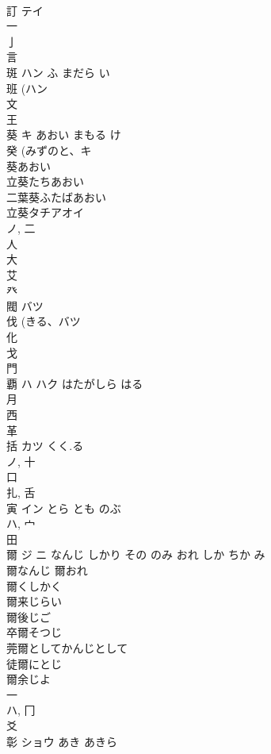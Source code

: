 \documentclass[8pt]{extreport}
\begin{document}
\begin{CJK}{UTF8}{min}
\\	訂	テイ		
\\	一 
\\	亅 
\\	言 
\\	斑	ハン	ふ まだら い	
\\	班 (ハン 
\\	文 
\\	王 
\\	葵	キ	あおい まもる け	
\\	癸 (みずのと、キ 
\\	葵あおい 
\\	立葵たちあおい 
\\	二葉葵ふたばあおい 
\\	立葵タチアオイ 
\\	ノ, 二 
\\	人 
\\	大 
\\	艾 
\\	癶 
\\	閥	バツ		
\\	伐 (きる、バツ 
\\	化 
\\	戈 
\\	門 
\\	覇	ハ ハク	はたがしら はる	
\\	月 
\\	西 
\\	革 
\\	括	カツ	くく.る	
\\	ノ, 十 
\\	口 
\\	扎, 舌 
\\	寅	イン	とら とも のぶ	
\\	ハ, 宀 
\\	田 
\\	爾	ジ ニ	なんじ しかり その のみ おれ しか ちか み	
\\	爾なんじ 爾おれ 
\\	爾くしかく 
\\	爾来じらい 
\\	爾後じご 
\\	卒爾そつじ 
\\	莞爾としてかんじとして 
\\	徒爾にとじ 
\\	爾余じよ 
\\	一 
\\	ハ, 冂 
\\	爻 
\\	彰	ショウ	あき あきら	

\end{CJK}
\end{document}
